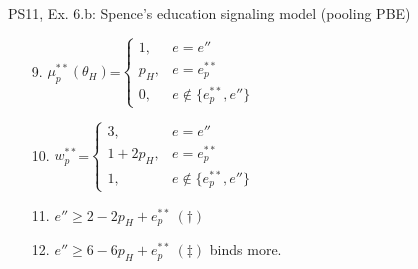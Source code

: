 \begin{frame}{PS11, Ex. 6.b: Spence’s education signaling model (pooling PBE)}
\begin{multicols}{2}
\begin{enumerate}
\begin{itemize}
          \item[8.ii] The firm believes that any deviation from the pooling eq. would be by a low ability type.
        \end{itemize}
        \item[9.] $\mu_p^{**}(\theta_H)$=$\left\{\begin{array}{rl}
                      1, & e = e'' \\
                      p_H, & e = e_p^{**} \\
                      0, & e \notin \{e_p^{**},e''\}
                    \end{array}\right.$
        \item[10.] $w_p^{**}$=$\left\{\begin{array}{rl}
                      3, & e = e'' \\
                      1+2p_H, & e = e_p^{**} \\
                      1, & e \notin \{e_p^{**},e''\}
                    \end{array}\right.$
        \item[11.] $e'' \geq 2-2p_H+e_p^{**}\ (\dagger)$
        \item[12.] $e'' \geq 6-6p_H+e_p^{**}\ (\ddagger)$ binds more.
      \end{enumerate}
      \vfill\null
    \end{multicols}
\end{frame}
